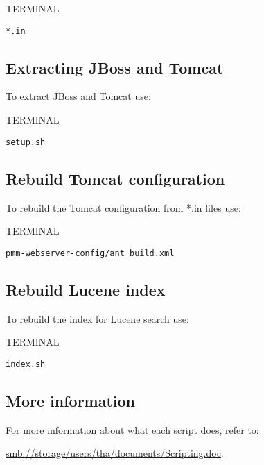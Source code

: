 \documentclass[10pt,a4paper]{article}
\begin{document}
\begin{command}{TERMINAL}

\begin{lstlisting}
*.in
\end{lstlisting}

\end{command}

\subsection{Extracting JBoss and Tomcat}
To extract JBoss and Tomcat use:

\begin{command}{TERMINAL}

\begin{lstlisting}
setup.sh
\end{lstlisting}

\end{command}

\subsection{Rebuild Tomcat configuration}
To rebuild the Tomcat configuration from *.in files use:

\begin{command}{TERMINAL}

\begin{lstlisting}
pmm-webserver-config/ant build.xml
\end{lstlisting}

\end{command}

\subsection{Rebuild Lucene index}
To rebuild the index for Lucene search use:

\begin{command}{TERMINAL}

\begin{lstlisting}
index.sh
\end{lstlisting}

\end{command}


\subsection{More information}
For more information about what each script does, refer to:

\href{smb://storage/users/tha/documents/Scripting.doc}{smb://storage/users/tha/documents/Scripting.doc}.


\end{document}
